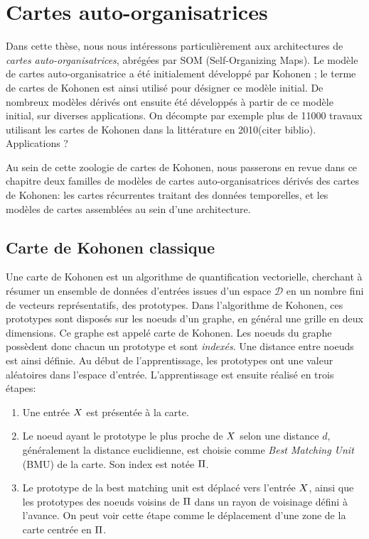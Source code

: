 \section{Cartes auto-organisatrices}\label{sec:som001}

Dans cette thèse, nous nous intéressons particulièrement aux architectures de \emph{cartes auto-organisatrices}, abrégées par SOM (Self-Organizing Maps). Le modèle de cartes auto-organisatrice a été initialement développé par Kohonen \cite{Kohonen1982}; le terme de cartes de Kohonen est ainsi utilisé pour désigner ce modèle initial. De nombreux modèles dérivés ont ensuite été développés à partir de ce modèle initial, sur diverses applications. On décompte par exemple plus de 11000 travaux utilisant les cartes de Kohonen dans la littérature en 2010(citer biblio).
Applications ?

Au sein de cette zoologie de cartes de Kohonen, nous passerons en revue dans ce chapitre deux familles de modèles de cartes auto-organisatrices dérivés des cartes de Kohonen: les cartes récurrentes traitant des données temporelles, et les modèles de cartes assemblées au sein d'une architecture.
\subsection{Carte de Kohonen classique}

Une carte de Kohonen est un algorithme de quantification vectorielle, cherchant à résumer un ensemble de données d'entrées issues d'un espace $\mathcal{D}$ en un nombre fini de vecteurs représentatifs, des prototypes.  Dans l'algorithme de Kohonen, ces prototypes sont disposés sur les noeuds d'un graphe, en général une grille en deux dimensions. Ce graphe est appelé carte de Kohonen. Les noeuds du graphe possèdent donc chacun un prototype et sont \emph{indexés}. Une distance entre noeuds est ainsi définie.
Au début de l'apprentissage, les prototypes ont une valeur aléatoires dans l'espace d'entrée. L'apprentissage est ensuite réalisé en trois étapes:
\begin{enumerate}
\item Une entrée $X$ est présentée à la carte.
\item Le noeud ayant le prototype le plus proche de $X$ selon une distance $d$, généralement la distance euclidienne, est choisie comme \emph{Best Matching Unit} (BMU) de la carte. Son index est notée $\Pi$.
\item Le prototype de la best matching unit est déplacé vers l'entrée $X$, ainsi que les prototypes des noeuds voisins de $\Pi$ dans un rayon de voisinage défini à l'avance. On peut voir cette étape comme le déplacement d'une zone de la carte centrée en $\Pi$.
\end{enumerate}

